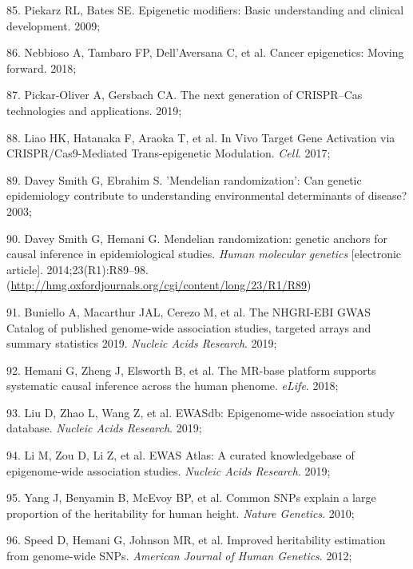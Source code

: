 \documentclass[11pt,oneside]{bristolthesis}
\newenvironment{cslreferences}%
  {}%
  {\par}
\begin{document}
\begin{cslreferences}
\leavevmode\hypertarget{ref-Piekarz2009}{}%
85. Piekarz RL, Bates SE. Epigenetic modifiers: Basic understanding and clinical development. 2009;

\leavevmode\hypertarget{ref-Nebbioso2018}{}%
86. Nebbioso A, Tambaro FP, Dell'Aversana C, et al. Cancer epigenetics: Moving forward. 2018;

\leavevmode\hypertarget{ref-Pickar-Oliver2019}{}%
87. Pickar-Oliver A, Gersbach CA. The next generation of CRISPR--Cas technologies and applications. 2019;

\leavevmode\hypertarget{ref-Liao2017}{}%
88. Liao HK, Hatanaka F, Araoka T, et al. In Vivo Target Gene Activation via CRISPR/Cas9-Mediated Trans-epigenetic Modulation. \emph{Cell}. 2017;

\leavevmode\hypertarget{ref-DaveySmith2003}{}%
89. Davey Smith G, Ebrahim S. 'Mendelian randomization': Can genetic epidemiology contribute to understanding environmental determinants of disease? 2003;

\leavevmode\hypertarget{ref-DaveySmith2014}{}%
90. Davey Smith G, Hemani G. Mendelian randomization: genetic anchors for causal inference in epidemiological studies. \emph{Human molecular genetics} {[}electronic article{]}. 2014;23(R1):R89--98. (\url{http://hmg.oxfordjournals.org/cgi/content/long/23/R1/R89})

\leavevmode\hypertarget{ref-Buniello2019}{}%
91. Buniello A, Macarthur JAL, Cerezo M, et al. The NHGRI-EBI GWAS Catalog of published genome-wide association studies, targeted arrays and summary statistics 2019. \emph{Nucleic Acids Research}. 2019;

\leavevmode\hypertarget{ref-Hemani2018}{}%
92. Hemani G, Zheng J, Elsworth B, et al. The MR-base platform supports systematic causal inference across the human phenome. \emph{eLife}. 2018;

\leavevmode\hypertarget{ref-Liu2019}{}%
93. Liu D, Zhao L, Wang Z, et al. EWASdb: Epigenome-wide association study database. \emph{Nucleic Acids Research}. 2019;

\leavevmode\hypertarget{ref-Li2019}{}%
94. Li M, Zou D, Li Z, et al. EWAS Atlas: A curated knowledgebase of epigenome-wide association studies. \emph{Nucleic Acids Research}. 2019;

\leavevmode\hypertarget{ref-Yang2010}{}%
95. Yang J, Benyamin B, McEvoy BP, et al. Common SNPs explain a large proportion of the heritability for human height. \emph{Nature Genetics}. 2010;

\leavevmode\hypertarget{ref-Speed2012}{}%
96. Speed D, Hemani G, Johnson MR, et al. Improved heritability estimation from genome-wide SNPs. \emph{American Journal of Human Genetics}. 2012;


\end{cslreferences}
\end{document}
